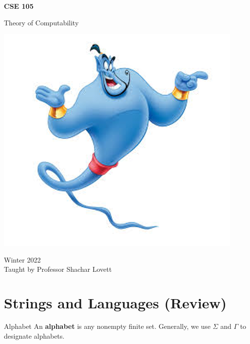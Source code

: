 \documentclass[letterpaper]{article}
\begin{document}
\begin{titlepage}
    \begin{center}
        \vspace*{1cm}
            
        \Huge
        \textbf{CSE 105}
            
        \vspace{0.5cm}
        \LARGE
        Theory of Computability
            
        \vspace{1.5cm}
        
        \begin{center}
            \includegraphics[scale=0.5]{assets/genie.png}
        \end{center}
        \vfill
            
        Winter 2022 \\
        Taught by Professor Shachar Lovett
    \end{center}
\end{titlepage}


\newpage 

\begingroup
    \renewcommand\contentsname{Table of Contents}
    \tableofcontents
\endgroup

\newpage
{}

\section{Strings and Languages (Review)}
\begin{definition}{Alphabet}{}
    An \textbf{alphabet} is any nonempty finite set. Generally, we use $\Sigma$ and $\Gamma$ to designate alphabets.
\end{definition}
\end{document}
